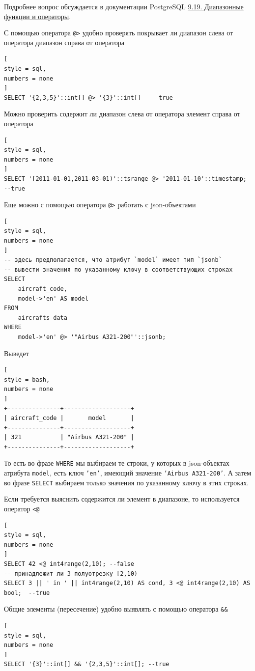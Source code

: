 \documentclass[%
	11pt,
	a4paper,
	utf8,
		]{article}
\begin{document}
Подробнее вопрос обсуждается в документации PostgreSQL \href{https://postgrespro.ru/docs/postgrespro/10/functions-range}{9.19. Диапазонные функции и операторы}.

С помощью оператора \verb|@>| удобно проверять покрывает ли диапазон слева от оператора диапазон справа от оператора
\begin{lstlisting}[
style = sql,
numbers = none
]
SELECT '{2,3,5}'::int[] @> '{3}'::int[]  -- true
\end{lstlisting}

Можно проверить содержит ли диапазон слева от оператора элемент справа от оператора
\begin{lstlisting}[
style = sql,
numbers = none
]
SELECT '[2011-01-01,2011-03-01)'::tsrange @> '2011-01-10'::timestamp;  --true
\end{lstlisting}

Еще можно с помощью оператора \texttt{@>} работать с json-объектами
\begin{lstlisting}[
style = sql,
numbers = none
]
-- здесь предполагается, что атрибут `model` имеет тип `jsonb`
-- вывести значения по указанному ключу в соответствующих строках
SELECT
    aircraft_code,
    model->'en' AS model
FROM
    aircrafts_data
WHERE
    model->'en' @> '"Airbus A321-200"'::jsonb;
\end{lstlisting}

Выведет
\begin{lstlisting}[
style = bash,
numbers = none
]
+---------------+-------------------+
| aircraft_code |       model       |
+---------------+-------------------+
| 321           | "Airbus A321-200" |
+---------------+-------------------+
\end{lstlisting}

То есть во фразе \texttt{WHERE} мы выбираем те строки, у которых в json-объектах атрибута \texttt{model}, есть ключ \texttt{'en'}, имеющий значение \texttt{'Airbus A321-200'}. А затем во фразе \texttt{SELECT} выбираем только значения по указанному ключу в этих строках.

Если требуется выяснить содержится ли элемент в диапазоне, то используется оператор \verb|<@|
\begin{lstlisting}[
style = sql,
numbers = none
]
SELECT 42 <@ int4range(2,10); --false
-- принадлежит ли 3 полуотрезку [2,10)
SELECT 3 || ' in ' || int4range(2,10) AS cond, 3 <@ int4range(2,10) AS bool;  --true
\end{lstlisting}

Общие элементы (пересечение) удобно выявлять с помощью оператора \verb|&&|
\begin{lstlisting}[
style = sql,
numbers = none
]
SELECT '{3}'::int[] && '{2,3,5}'::int[]; --true
\end{lstlisting}
\end{document}
